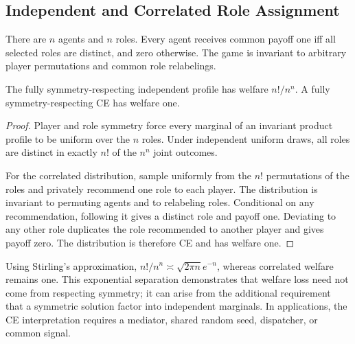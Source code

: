 \subsection{Independent and Correlated Role Assignment}

There are $n$ agents and $n$ roles.  Every agent receives common payoff one iff all selected roles are distinct, and zero otherwise.  The game is invariant to arbitrary player permutations and common role relabelings.

\begin{proposition}
\label{prop:supp-role}
The fully symmetry-respecting independent profile has welfare $n!/n^n$.  A fully symmetry-respecting CE has welfare one.
\end{proposition}
\begin{proof}
Player and role symmetry force every marginal of an invariant product profile to be uniform over the $n$ roles.  Under independent uniform draws, all roles are distinct in exactly $n!$ of the $n^n$ joint outcomes.

For the correlated distribution, sample uniformly from the $n!$ permutations of the roles and privately recommend one role to each player.  The distribution is invariant to permuting agents and to relabeling roles.  Conditional on any recommendation, following it gives a distinct role and payoff one.  Deviating to any other role duplicates the role recommended to another player and gives payoff zero.  The distribution is therefore CE and has welfare one.
\end{proof}

Using Stirling's approximation, $n!/n^n\asymp\sqrt{2\pi n}e^{-n}$, whereas correlated welfare remains one.  This exponential separation demonstrates that welfare loss need not come from respecting symmetry; it can arise from the additional requirement that a symmetric solution factor into independent marginals.  In applications, the CE interpretation requires a mediator, shared random seed, dispatcher, or common signal.
